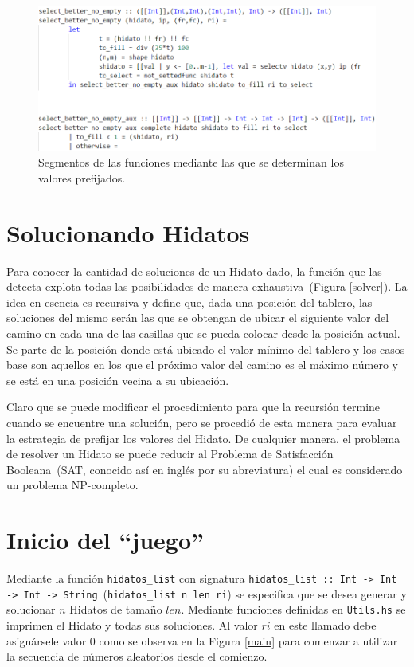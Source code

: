 \documentclass{llncs}
\begin{document}
\begin{figure}
\begin{center}
\includegraphics[width= 1\columnwidth]{figuras/select}
\end{center}
\caption{Segmentos de las funciones mediante las que se determinan los valores prefijados.}
\label{select}
\end{figure}
\section{Solucionando Hidatos}
Para conocer la cantidad de soluciones de un Hidato dado, la funci\'on que las detecta explota todas las posibilidades de manera exhaustiva~(Figura \ref{solver}). La idea en esencia es recursiva y define que, dada una posici\'on del tablero, las soluciones del mismo ser\'an las que se obtengan de ubicar el siguiente valor del camino en cada una de las casillas que se pueda colocar desde la posici\'on actual. Se parte de la posici\'on donde est\'a ubicado el valor m\'inimo del tablero y los casos base son aquellos en los que el pr\'oximo valor del camino es el m\'aximo n\'umero y se est\'a en una posici\'on vecina a su ubicaci\'on.


Claro que se puede modificar el procedimiento para que la recursi\'on termine cuando se encuentre una soluci\'on, pero se procedi\'o de esta manera para evaluar la estrategia de prefijar los valores del Hidato. De cualquier manera, el problema de resolver un Hidato se puede reducir al Problema de Satisfacci\'on Booleana~(SAT, conocido as\'i en ingl\'es por su abreviatura) el cual es considerado un problema NP-completo\cite{serio}.

\section{Inicio del ``juego''}
Mediante la funci\'on \texttt{hidatos\_list} con signatura \texttt{hidatos\_list :: Int -> Int -> Int -> String}~(\texttt{hidatos\_list n len ri}) se especifica que se desea generar y solucionar $n$ Hidatos de tama\~no $len$. Mediante funciones definidas en \texttt{Utils.hs} se imprimen el Hidato y todas sus soluciones. Al valor $ri$ en este llamado debe asign\'arsele valor $0$ como se observa en la Figura \ref{main} para comenzar a utilizar la secuencia de n\'umeros aleatorios desde el comienzo.
\end{document}
